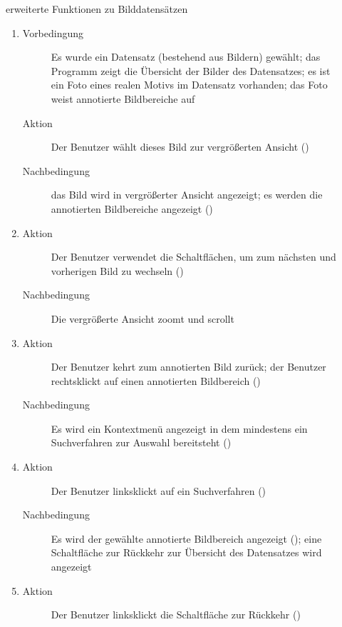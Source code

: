 \begin{description}
	\item[] erweiterte Funktionen zu Bilddatensätzen
	\begin{enumerate}
		\item
		\begin{description}
			\item[Vorbedingung] Es wurde ein Datensatz (bestehend aus Bildern) gewählt; das Programm zeigt die Übersicht der Bilder des Datensatzes; es ist ein Foto eines realen Motivs im Datensatz vorhanden; das Foto weist annotierte Bildbereiche auf
			\item[Aktion] Der Benutzer wählt dieses Bild zur vergrößerten Ansicht ()
			\item[Nachbedingung] das Bild wird in vergrößerter Ansicht angezeigt; es werden die annotierten Bildbereiche angezeigt ()
		\end{description}
		\item
		\begin{description}
			\item[Aktion] Der Benutzer verwendet die Schaltflächen, um zum nächsten und vorherigen Bild zu wechseln ()
			\item[Nachbedingung] Die vergrößerte Ansicht zoomt und scrollt
		\end{description}
		\item
		\begin{description}
			\item[Aktion] Der Benutzer kehrt zum annotierten Bild zurück; der Benutzer rechtsklickt auf einen annotierten Bildbereich ()
			\item[Nachbedingung] Es wird ein Kontextmenü angezeigt in dem mindestens ein Suchverfahren zur Auswahl bereitsteht ()
		\end{description}
		\item
		\begin{description}
			\item[Aktion] Der Benutzer linksklickt auf ein Suchverfahren ()
			\item[Nachbedingung] Es wird der gewählte annotierte Bildbereich angezeigt (); eine Schaltfläche zur Rückkehr zur Übersicht des Datensatzes wird angezeigt
		\end{description}
		\item
		\begin{description}
			\item[Aktion] Der Benutzer linksklickt die Schaltfläche zur Rückkehr ()

\end{description}
\end{enumerate}
\end{description}

